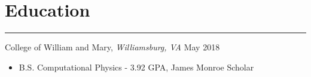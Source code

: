 \documentclass[12pt]{article}
\begin{document}

\vspace{-0.50cm}
\section*{Education}
\vspace{-0.1cm}
\hrule
\vspace{0.25cm}

\noindent College of William and Mary, \textit{Williamsburg, VA} \hfill May 2018
\vspace{-0.1cm}
\begin{itemize}
  \itemsep-0.4em
        \item B.S. Computational Physics - 3.92 GPA, James Monroe Scholar
\end{itemize}
\end{document}
